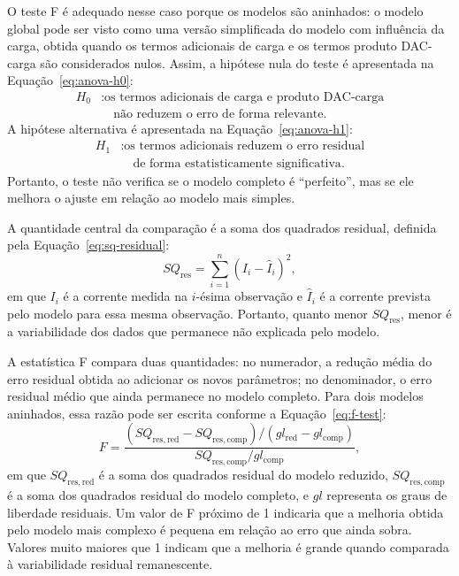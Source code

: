 \documentclass[
  brazilian,
]{article}
\renewcommand{\_}{\oldunderscore\discretionary{}{}{}}
\begin{document}
O teste F é adequado nesse caso porque os modelos são aninhados: o modelo
global pode ser visto como uma versão simplificada do modelo com influência
da carga, obtida quando os termos adicionais de carga e os termos produto
DAC-carga são considerados
nulos. Assim, a hipótese nula do teste é apresentada na
Equação~\ref{eq:anova-h0}:
\begin{equation}
\begin{aligned}
H_0 &: \text{os termos adicionais de carga e produto DAC-carga}\\
&\quad \text{não reduzem o erro de forma relevante}.
\end{aligned}
\label{eq:anova-h0}
\end{equation}
A hipótese alternativa é apresentada na Equação~\ref{eq:anova-h1}:
\begin{equation}
\begin{aligned}
H_1 &: \text{os termos adicionais reduzem o erro residual}\\
&\quad \text{de forma estatisticamente significativa}.
\end{aligned}
\label{eq:anova-h1}
\end{equation}
Portanto, o teste não verifica se o modelo completo é ``perfeito'', mas
se ele melhora o ajuste em relação ao modelo mais simples.

A quantidade central da comparação é a soma dos quadrados residual,
definida pela Equação~\ref{eq:sq-residual}:
\begin{equation}
SQ_{\mathrm{res}} = \sum_{i=1}^{n} (I_i - \hat{I}_i)^2,
\label{eq:sq-residual}
\end{equation}
em que \(I_i\) é a corrente medida na \(i\)-ésima observação e
\(\hat{I}_i\) é a corrente prevista pelo modelo para essa mesma
observação. Portanto, quanto menor \(SQ_{\mathrm{res}}\), menor é a
variabilidade dos dados que permanece não explicada pelo modelo.

A estatística F compara duas quantidades: no numerador, a redução média do
erro residual obtida ao adicionar os novos parâmetros; no denominador, o
erro residual médio que ainda permanece no modelo completo. Para dois
modelos aninhados, essa razão pode ser escrita conforme a
Equação~\ref{eq:f-test}:
\begin{equation}
F =
\frac{(SQ_{\mathrm{res,red}} - SQ_{\mathrm{res,comp}})/(gl_{\mathrm{red}} - gl_{\mathrm{comp}})}
{SQ_{\mathrm{res,comp}}/gl_{\mathrm{comp}}},
\label{eq:f-test}
\end{equation}
em que \(SQ_{\mathrm{res,red}}\) é a soma dos quadrados residual do modelo
reduzido, \(SQ_{\mathrm{res,comp}}\) é a soma dos quadrados residual do
modelo completo, e \(gl\) representa os graus de liberdade residuais. Um
valor de F próximo de 1 indicaria que a melhoria obtida pelo modelo mais
complexo é pequena em relação ao erro que ainda sobra. Valores muito
maiores que 1 indicam que a melhoria é grande quando comparada à
variabilidade residual remanescente.
\end{document}
